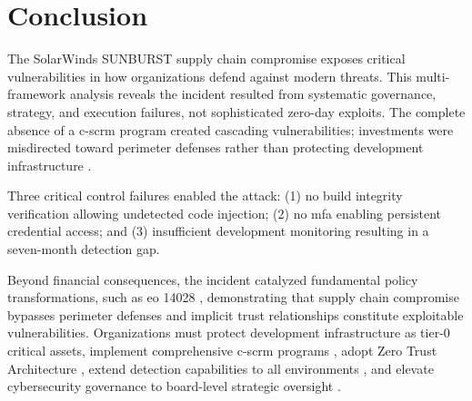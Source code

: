 \section{Conclusion}
\label{sec:conclusion}

The SolarWinds SUNBURST supply chain compromise exposes critical vulnerabilities in how organizations defend against modern threats. This multi-framework analysis reveals the incident resulted from systematic governance, strategy, and execution failures, not sophisticated zero-day exploits. The complete absence of a \gls{c-scrm} program created cascading vulnerabilities; investments were misdirected toward perimeter defenses rather than protecting development infrastructure \cite{nagle2023}.

Three critical control failures enabled the attack: (1) no build integrity verification allowing undetected code injection; (2) no \gls{mfa} enabling persistent credential access; and (3) insufficient development monitoring resulting in a seven-month detection gap.

Beyond financial consequences, the incident catalyzed fundamental policy transformations, such as \gls{eo} 14028 \cite{biden2021}, demonstrating that supply chain compromise bypasses perimeter defenses and implicit trust relationships constitute exploitable vulnerabilities. Organizations must protect development infrastructure as tier-0 critical assets, implement comprehensive \gls{c-scrm} programs \cite{boyens2024}, adopt Zero Trust Architecture \cite{rose2020}, extend detection capabilities to all environments \cite{nelson2025}, and elevate cybersecurity governance to board-level strategic oversight \cite{pascoe2024}.
